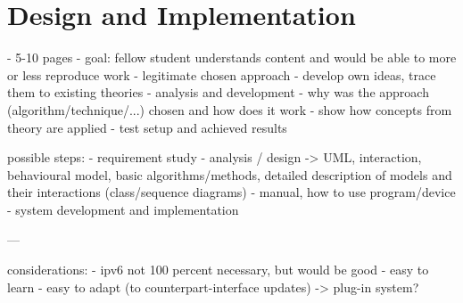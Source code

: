 \chapter{Design and Implementation} %

- 5-10 pages
- goal: fellow student understands content and would be able to more or less reproduce work
- legitimate chosen approach
- develop own ideas, trace them to existing theories
- analysis and development
- why was the approach (algorithm/technique/...) chosen and how does it work
- show how concepts from theory are applied
- test setup and achieved results

possible steps:
- requirement study
- analysis / design -> UML, interaction, behavioural model, basic algorithms/methods, detailed description of models and their interactions (class/sequence diagrams)
- manual, how to use program/device
- system development and implementation

---

considerations:
- ipv6 not 100 percent necessary, but would be good
- easy to learn
- easy to adapt (to counterpart-interface updates) -> plug-in system?


